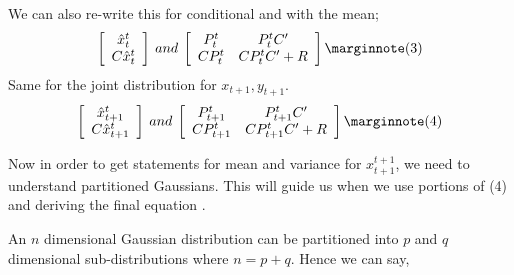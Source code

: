 We can also re-write this for conditional and with the mean;
\begin{eqnarray*}
\left[ \begin{array}{c}
      \hat{x}_{t}^t \\
      C\hat{x}_{t}^t
      \end{array} \right]
\:and\:      
\left[ \begin{array}{cc}
      P_{t}^t & P_{t}^tC' \\
      CP_{t}^t & CP_{t}^tC'+R
      \end{array} \right] \mlabel{3}
\end{eqnarray*}
Same for the joint distribution for $x_{t+1}, y_{t+1}$.
\begin{eqnarray*}
\left[ \begin{array}{c}
      \hat{x}_{t+1}^t \\
      C\hat{x}_{t+1}^t
      \end{array} \right]
\:and\:      
\left[ \begin{array}{cc}
      P_{t+1}^t & P_{t+1}^tC' \\
      CP_{t+1}^t & CP_{t+1}^tC'+R
      \end{array} \right] \mlabel{4}
\end{eqnarray*}

Now in order to get statements for mean and variance for $x_{t+1}^{t+1}$, we
need to understand partitioned Gaussians. This will guide us when we use
portions of (4) and deriving the final equation \cite{jordan}. 

An $n$ dimensional Gaussian distribution can be partitioned into $p$ and $q$
dimensional sub-distributions where $n = p + q$. Hence we can say,

